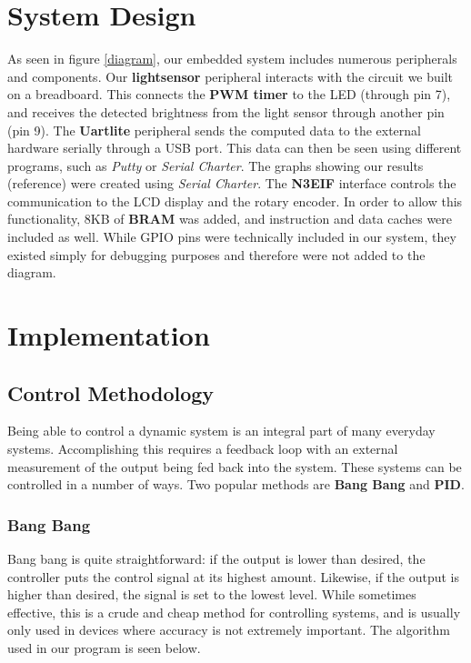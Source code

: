 \documentclass[11pt]{article}
\begin{document}
\section{System Design}
As seen in figure \ref{diagram}, our embedded system includes numerous peripherals and components. 
 Our \textbf{lightsensor} peripheral interacts with the circuit we built on a breadboard.  This connects the \textbf{PWM timer} to the LED (through pin 7), and receives the detected brightness from the light sensor through another pin (pin 9).  The \textbf{Uartlite} peripheral sends the computed data to the external hardware serially through a USB port.  This data can then be seen using different programs, such as \emph{Putty} or \emph{Serial Charter}.  The graphs showing our results (reference) were created using \emph{Serial Charter}. The \textbf{N3EIF} interface controls the communication to the LCD display and the rotary encoder. In order to allow this functionality, 8KB of \textbf{BRAM} was added, and instruction and data caches were included as well.  While GPIO pins were technically included in our system, they existed simply for debugging purposes and therefore were not added to the diagram.


\section{Implementation}

\subsection{Control Methodology}
Being able to control a dynamic system is an integral part of many everyday systems.  Accomplishing this requires a feedback loop with an external measurement of the output being fed back into the system.  These systems can be controlled in a number of ways.  Two popular methods are \textbf{Bang Bang} and \textbf{PID}.   

\subsubsection{Bang Bang} 
Bang bang is quite straightforward: if the output is lower than desired, the controller puts the control signal at its highest amount.  Likewise, if the output is higher than desired, the signal is set to the lowest level.  While sometimes effective, this is a crude and cheap method for controlling systems, and is usually only used in devices where accuracy is not extremely important. The algorithm used in our program is seen below.
\end{document}
